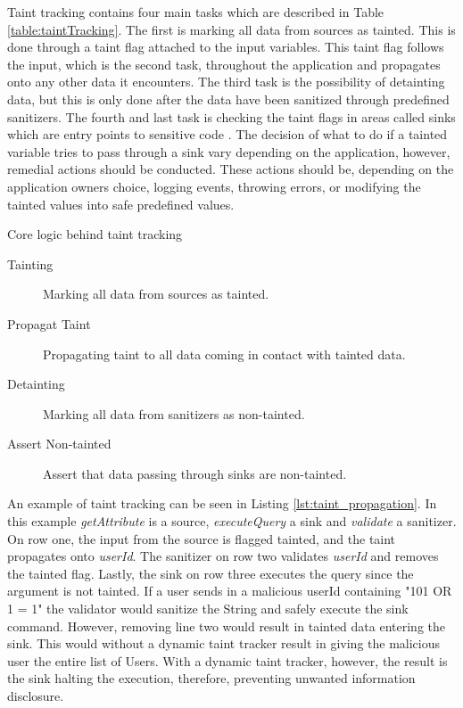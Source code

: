 Taint tracking contains four main tasks which are described in Table \ref{table:taintTracking}. The first is marking all data from sources as tainted. This is done through a taint flag attached to the input variables. This taint flag follows the input, which is the second task, throughout the application and propagates onto any other data it encounters. The third task is the possibility of detainting data, but this is only done after the data have been sanitized through predefined sanitizers. The fourth and last task is checking the taint flags in areas called sinks which are entry points to sensitive code \parencite{Pan2015, Venkataramani2008}. The decision of what to do if a tainted variable tries to pass through a sink vary depending on the application, however, remedial actions should be conducted. These actions should be, depending on the application owners choice, logging events, throwing errors, or modifying the tainted values into safe predefined values. 

\begin{table}[H]
  \centering
  \caption{Core logic behind taint tracking}
  \label{table:taintTracking}
  \begin{description}
    \item [Tainting] Marking all data from sources as tainted.
    \item [Propagat Taint] Propagating taint to all data coming in contact with tainted data.
    \item [Detainting] Marking all data from sanitizers as non-tainted.
    \item [Assert Non-tainted] Assert that data passing through sinks are non-tainted. 
  \end{description}
\end{table}

An example of taint tracking can be seen in Listing \ref{lst:taint_propagation}. In this example \textit{getAttribute} is a source, \textit{executeQuery} a sink and \textit{validate} a sanitizer. On row one, the input from the source is flagged tainted, and the taint propagates onto \textit{userId}. The sanitizer on row two validates \textit{userId} and removes the tainted flag. Lastly, the sink on row three executes the query since the argument is not tainted. If a user sends in a malicious userId containing "101 OR 1 = 1" the validator would sanitize the String and safely execute the sink command. However, removing line two would result in tainted data entering the sink. This would without a dynamic taint tracker result in giving the malicious user the entire list of Users. With a dynamic taint tracker, however, the result is the sink halting the execution, therefore, preventing unwanted information disclosure.

